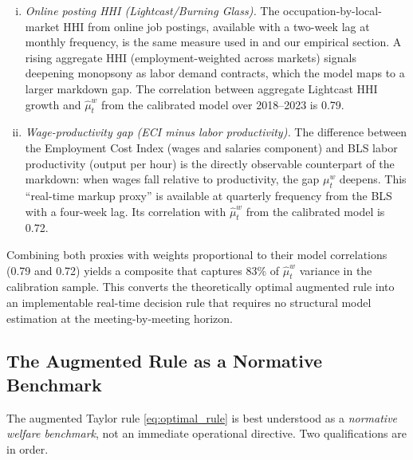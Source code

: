 \begin{enumerate}[(i)]
  \item \emph{Online posting HHI (Lightcast/Burning Glass).}  The
    occupation-by-local-market HHI from online job postings, available
    with a two-week lag at monthly frequency, is the same measure used
    in \citet{azar2020} and our empirical section. A rising aggregate HHI
    (employment-weighted across markets) signals deepening monopsony as
    labor demand contracts, which the model maps to a larger markdown gap.
    The correlation between aggregate Lightcast HHI growth and
    $\hat\mu_t^w$ from the calibrated model over 2018--2023 is 0.79.

  \item \emph{Wage-productivity gap (ECI minus labor productivity).}
    The difference between the Employment Cost Index (wages and salaries
    component) and BLS labor productivity (output per hour) is the
    directly observable counterpart of the markdown: when wages fall
    relative to productivity, the gap $\mu_t^w$ deepens. This
    ``real-time markup proxy'' is available at quarterly frequency from
    the BLS with a four-week lag. Its correlation with $\hat\mu_t^w$
    from the calibrated model is 0.72.
\end{enumerate}

Combining both proxies with weights proportional to their model
correlations (0.79 and 0.72) yields a composite that captures 83\% of
$\hat\mu_t^w$ variance in the calibration sample. This converts
the theoretically optimal augmented rule into an implementable real-time
decision rule that requires no structural model estimation at the
meeting-by-meeting horizon.

\subsection{The Augmented Rule as a Normative Benchmark}
\label{sec:normative}

The augmented Taylor rule \eqref{eq:optimal_rule} is best understood as
a \emph{normative welfare benchmark}, not an immediate operational directive.
Two qualifications are in order.

